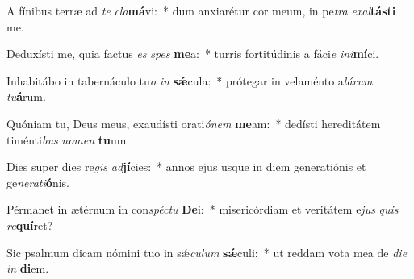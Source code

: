 \item A fínibus terræ ad \textit{te} \textit{cla}\textbf{má}vi:~* dum anxiarétur cor meum, in pe\textit{tra} \textit{ex}\textit{al}\textbf{tás}\textbf{ti} me.
\item Deduxísti me, quia factus \textit{es} \textit{spes} \textbf{me}a:~* turris fortitúdinis a fáci\textit{e} \textit{in}\textit{i}\textbf{mí}ci.
\item Inhabitábo in tabernáculo tu\textit{o} \textit{in} \textbf{sǽ}cula:~* prótegar in velaménto a\textit{lá}\textit{rum} \textit{tu}\textbf{á}rum.
\item Quóniam tu, Deus meus, exaudísti orati\textit{ó}\textit{nem} \textbf{me}am:~* dedísti hereditátem timénti\textit{bus} \textit{no}\textit{men} \textbf{tu}um.
\item Dies super dies re\textit{gis} \textit{ad}\textbf{jí}cies:~* annos ejus usque in diem generatiónis et ge\textit{ne}\textit{ra}\textit{ti}\textbf{ó}nis.
\item Pérmanet in ætérnum in con\textit{spéc}\textit{tu} \textbf{De}i:~* misericórdiam et veritátem e\textit{jus} \textit{quis} \textit{re}\textbf{quí}ret?
\item Sic psalmum dicam nómini tuo in sǽ\textit{cu}\textit{lum} \textbf{sǽ}culi:~* ut reddam vota mea de \textit{di}\textit{e} \textit{in} \textbf{di}em.
